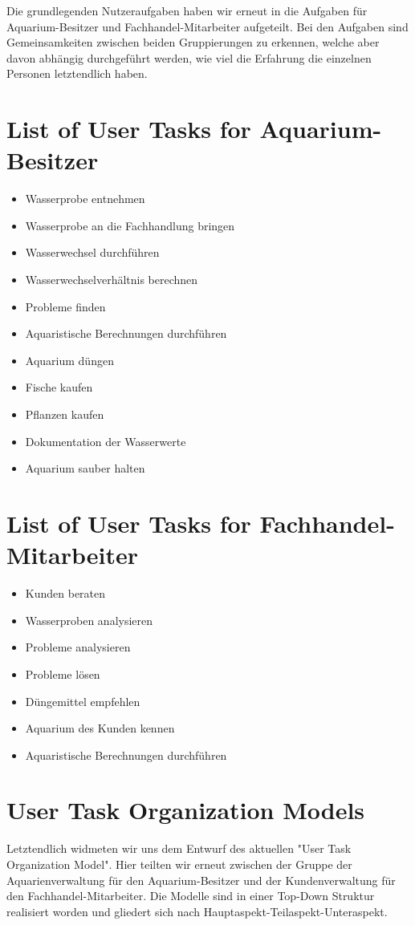 Die grundlegenden Nutzeraufgaben haben wir erneut in die Aufgaben für Aquarium-Besitzer und Fachhandel-Mitarbeiter aufgeteilt. Bei den Aufgaben sind Gemeinsamkeiten zwischen beiden Gruppierungen zu erkennen, welche aber davon abhängig durchgeführt werden, wie viel die Erfahrung die einzelnen Personen letztendlich haben.

\section{List of User Tasks for Aquarium-Besitzer}
\begin{itemize}
\item Wasserprobe entnehmen
\item Wasserprobe an die Fachhandlung bringen
\item Wasserwechsel durchführen
\item Wasserwechselverhältnis berechnen
\item Probleme finden
\item Aquaristische Berechnungen durchführen
\item Aquarium düngen
\item Fische kaufen
\item Pflanzen kaufen
\item Dokumentation der Wasserwerte
\item Aquarium sauber halten
\end{itemize}

\section{List of User Tasks for Fachhandel-Mitarbeiter}
\begin{itemize}
\item Kunden beraten
\item Wasserproben analysieren
\item Probleme analysieren
\item Probleme lösen
\item Düngemittel empfehlen
\item Aquarium des Kunden kennen
\item Aquaristische Berechnungen durchführen
\end{itemize}

\section{User Task Organization Models}\label{utd}
Letztendlich widmeten wir uns dem Entwurf des aktuellen "User Task Organization Model".\cite{Mayhew:UEL}
Hier teilten wir erneut zwischen der Gruppe der Aquarienverwaltung für den Aquarium-Besitzer und der Kundenverwaltung für den Fachhandel-Mitarbeiter. Die Modelle sind in einer Top-Down Struktur realisiert worden und gliedert sich nach Hauptaspekt-Teilaspekt-Unteraspekt. 

